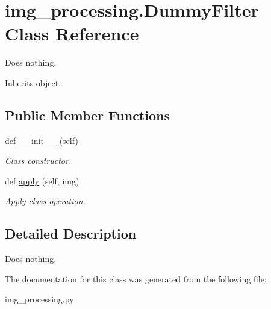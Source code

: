 \hypertarget{classimg__processing_1_1_dummy_filter}{}\section{img\+\_\+processing.\+Dummy\+Filter Class Reference}
\label{classimg__processing_1_1_dummy_filter}


Does nothing.  




Inherits object.

\subsection*{Public Member Functions}
\begin{DoxyCompactItemize}
\item 
\mbox{\label{classimg__processing_1_1_dummy_filter_ae303a2f6facd4a72d79030ec9551a36d}} 
def \mbox{\hyperlink{classimg__processing_1_1_dummy_filter_ae303a2f6facd4a72d79030ec9551a36d}{\+\_\+\+\_\+init\+\_\+\+\_\+}} (self)
\begin{DoxyCompactList}\small\item\em Class constructor. \end{DoxyCompactList}\item 
\mbox{\label{classimg__processing_1_1_dummy_filter_a00ba4151abb3eb85098104d696a45a91}} 
def \mbox{\hyperlink{classimg__processing_1_1_dummy_filter_a00ba4151abb3eb85098104d696a45a91}{apply}} (self, img)
\begin{DoxyCompactList}\small\item\em Apply class operation. \end{DoxyCompactList}\end{DoxyCompactItemize}


\subsection{Detailed Description}
Does nothing. 

The documentation for this class was generated from the following file\+:\begin{DoxyCompactItemize}
\item 
img\+\_\+processing.\+py\end{DoxyCompactItemize}
